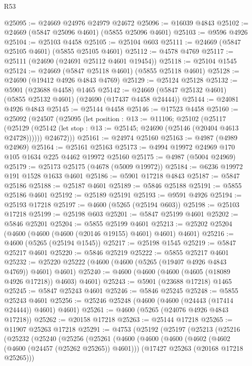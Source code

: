 \begin{lexlean}{R53}
\begin{coremodule}
@25095 := @24669 @24976 @24979 @24672
@25096 := @16039 @4843
@25102 := @24669 (@5847 @25096 @4601) (@5855 @25096 @4601)
@25103 := @9596 @4926
@25104 := @25103 @4458
@25105 := @25104 @603
@25111 := @24669 (@5847 @25105 @4601) (@5855 @25105 @4601)
@25112 := @4578 @4769
@25117 := @25111 (@24690 (@24691 @25112 @4601 @19454))
@25118 := @25104 @1545
@25124 := @24669 (@5847 @25118 @4601) (@5855 @25118 @4601)
@25128 := @24690 (@19412 @4926 @4843 @4769)
@25129 := @25124 @25128
@25132 := @5901 (@23688 @4458) @1465
@25142 := @24669 (@5847 @25132 @4601) (@5855 @25132 @4601) (@24690 (@17437 @4458 @24444))
@25144 := @24081 @4926 @4843
@25145 := @25144 @4458
@25146 := @17523 @4458
@25160 := @25092
    (@24507
      (@25095
        (let position : @13 := @11106;
        @25102
          (@25117
            (@25129 (@25142 (let stop : @13 := @25145; @24690 (@25146 (@20404 @4613 @24728))))))
          @24672)))
@25161 := @24974 @25160
@25163 := @4987 (@4989 @24969)
@25164 := @25161 @25163
@25173 := @4994 @19972 @24969 @170 @105 @1634 @225 @4462 @19972 @25160
@25175 := @4987 (@5004 @24969)
@25179 := @25173 @25175 (@4678 (@5009 @19972))
@25184 := @6236 @19972 @191 @1528 @1633 @4601
@25186 := @5901 @17218 @4843
@25187 := @5847 @25186
@25188 := @25187 @4601
@25189 := @5846 @25188
@25191 := @5855 @25186 @4601
@25192 := @25189 @25191
@25193 := @9591 @4926
@25194 := @25193 @17218
@25197 := @4600 (@5265 (@25194 @603))
@25198 := @25103 @17218
@25199 := @25198 @603
@25201 := @5847 @25199 @4601
@25202 := @5846 @25201
@25204 := @5855 @25199 @4601
@25213 := @25202 @25204 (@4600 (@4600 (@4600 (@20146 @19155) @4601) @4601) @4601)
@25216 := @4600 (@5265 (@25194 @1545))
@25217 := @25198 @1545
@25219 := @5847 @25217 @4601
@25220 := @5846 @25219
@25222 := @5855 @25217 @4601
@25232 := @25220 @25222 (@4600 (@4600 (@5265 (@19407 @4926 @4843 @4769)) @4601) @4601)
@25240 := @4600 (@4600 (@4600 (@4605 (@18089 @4926 @17218)) @4603) @4601)
@25243 := @5901 (@23688 @17218) @1465
@25245 := @5847 @25243 @4601
@25246 := @5846 @25245
@25248 := @5855 @25243 @4601
@25256 := @25246 @25248 (@4600 (@4600 (@24443 (@17414 @24444)) @4601) @4601)
@25261 := @4600 (@5265 (@24076 @4926 @4843 @17218))
@25262 := @20158 @17218
@25263 := @25144 @17218
@25265 := @11907 @25263 @17218
@25291 := @4753
    (@25192
      (@25197
        (@25213
          (@25216
            (@25232
              (@25240
                (@25256
                  (@25261
                    (@4600
                      (@4600
                        (@4600
                          (@4602 (@4602 (@4600 (@24457 (@25262 @25265)) @4601)))
                          (@17427 @25263 (@20168 @17218 @25265)))

\end{coremodule}
\end{lexlean}
